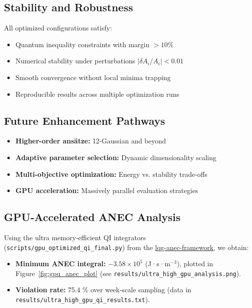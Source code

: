 \documentclass[11pt]{article}
\begin{document}
\subsection*{Stability and Robustness}
All optimized configurations satisfy:
\begin{itemize}
\item Quantum inequality constraints with margin $>10\%$
\item Numerical stability under perturbations $|\delta A_i/A_i| < 0.01$
\item Smooth convergence without local minima trapping
\item Reproducible results across multiple optimization runs
\end{itemize}

\subsection*{Future Enhancement Pathways}
\begin{itemize}
\item \textbf{Higher-order ansätze:} 12-Gaussian and beyond
\item \textbf{Adaptive parameter selection:} Dynamic dimensionality scaling
\item \textbf{Multi-objective optimization:} Energy vs. stability trade-offs
\item \textbf{GPU acceleration:} Massively parallel evaluation strategies
\end{itemize}

\subsection{GPU‐Accelerated ANEC Analysis}

Using the ultra memory‐efficient QI integrators 
(\texttt{scripts/gpu\_optimized\_qi\_final.py}) from the
\href{https://github.com/arcticoder/lqg-anec-framework}{lqg-anec-framework}, we obtain:

\begin{itemize}
  \item \textbf{Minimum ANEC integral:} \(-3.58\times10^5\) (J·s·m$^{-3}$),  
    plotted in Figure~\ref{fig:gpu_anec_plot} (see \texttt{results/ultra\_high\_gpu\_analysis.png}).
  \item \textbf{Violation rate:} 75.4 \% over week‐scale sampling (data in
    \texttt{results/ultra\_high\_gpu\_qi\_results.txt}).
\end{itemize}
\end{document}

